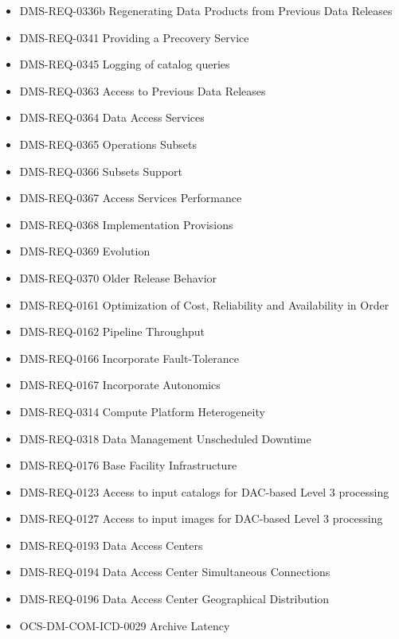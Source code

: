 \begin{itemize}
\item DMS-REQ-0336b Regenerating Data Products from Previous Data Releases
\item DMS-REQ-0341 Providing a Precovery Service
\item DMS-REQ-0345 Logging of catalog queries
\item DMS-REQ-0363 Access to Previous Data Releases
\item DMS-REQ-0364 Data Access Services
\item DMS-REQ-0365 Operations Subsets
\item DMS-REQ-0366 Subsets Support
\item DMS-REQ-0367 Access Services Performance
\item DMS-REQ-0368 Implementation Provisions
\item DMS-REQ-0369 Evolution
\item DMS-REQ-0370 Older Release Behavior
\item DMS-REQ-0161 Optimization of Cost, Reliability and Availability in Order
\item DMS-REQ-0162 Pipeline Throughput
\item DMS-REQ-0166 Incorporate Fault-Tolerance
\item DMS-REQ-0167 Incorporate Autonomics
\item DMS-REQ-0314 Compute Platform Heterogeneity
\item DMS-REQ-0318 Data Management Unscheduled Downtime
\item DMS-REQ-0176 Base Facility Infrastructure
\item DMS-REQ-0123 Access to input catalogs for DAC-based Level 3 processing
\item DMS-REQ-0127 Access to input images for DAC-based Level 3 processing
\item DMS-REQ-0193 Data Access Centers
\item DMS-REQ-0194 Data Access Center Simultaneous Connections
\item DMS-REQ-0196 Data Access Center Geographical Distribution
\item OCS-DM-COM-ICD-0029 Archive Latency
\end{itemize}
